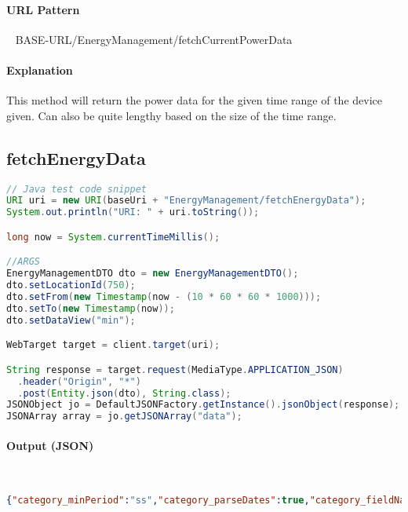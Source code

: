\documentclass[
10pt, %
letterpaper, %
oneside, %
headinclude,footinclude, %
BCOR5mm, %
]{scrartcl}
\begin{document}
\paragraph{URL Pattern} 
~\newline
BASE-URL/EnergyManagement/fetchCurrentPowerData

\paragraph{Explanation} This method will return the power data for the given time range of the device given. Can also be quite lengthy based on the size of the time range.


\subsection{\textbf{fetchEnergyData}}

\begin{lstlisting}[language=Java]
// Java test code snippet
URI uri = new URI(baseUri + "EnergyManagement/fetchEnergyData");
System.out.println("URI: " + uri.toString());

long now = System.currentTimeMillis();

//ARGS
EnergyManagementDTO dto = new EnergyManagementDTO();
dto.setLocationId(750);
dto.setFrom(new Timestamp(now - (10 * 60 * 60 * 1000)));
dto.setTo(new Timestamp(now));
dto.setDataView("min");

WebTarget target = client.target(uri);

String response = target.request(MediaType.APPLICATION_JSON)
  .header("Origin", "*")
  .post(Entity.json(dto), String.class);
JSONObject jo = DefaultJSONFactory.getInstance().jsonObject(response);
JSONArray array = jo.getJSONArray("data");
\end{lstlisting}

\paragraph{Output (JSON)} ~
\begin{lstlisting}[language=json]
{"category_minPeriod":"ss","category_parseDates":true,"category_fieldName":"x","data":[{"y00":316142.0911458333,"x":1404372060000},{"y00":316142.0911458333,"x":1404372120000},{"y00":318033.68072916666,"x":1404372180000},{"y00":320159.5260416666,"x":1404372240000},{"y00":316298.3947916667,"x":1404372300000},{"y00":316549.3114583333,"x":1404372360000},{"y00":316329.03489583335,"x":1404372420000},{"y00":311928.7729166667,"x":1404372480000},{"y00":313797.12604166666,"x":1404372540000},{"y00":313572.5526041667,"x":1404372600000},{"y00":313185.6244791667,"x":1404372660000},{"y00":317352.1666666667,"x":1404372720000},{"y00":324432.31614583335,"x":1404372780000}...}
\end{lstlisting}
\end{document}
